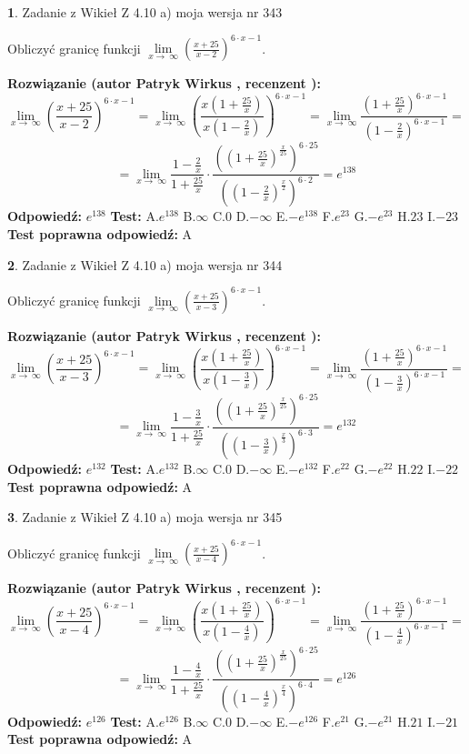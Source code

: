 \documentclass[12pt, a4paper]{article}
\theoremstyle{definition} %
\newtheorem{zad}{}
\newcommand{\zadStart}[1]{\begin{zad}#1\newline}
\newcommand{\zadStop}{\end{zad}}
\newcommand{\rozwStart}[2]{\noindent \textbf{Rozwiązanie (autor #1 , recenzent #2): }\newline}
\newcommand{\rozwStop}{\newline}
\newcommand{\odpStart}{\noindent \textbf{Odpowiedź:}\newline}
\newcommand{\odpStop}{\newline}
\newcommand{\testStart}{\noindent \textbf{Test:}\newline}
\newcommand{\testStop}{\newline}
\newcommand{\kluczStart}{\noindent \textbf{Test poprawna odpowiedź:}\newline}
\newcommand{\kluczStop}{\newline}
\begin{document}
\zadStart{Zadanie z Wikieł Z 4.10 a) moja wersja nr 343}

Obliczyć granicę funkcji  $\lim\limits_{x\to\ \infty}(\frac{x+25}{x-2})^{6\cdot x-1}$.
\zadStop
\rozwStart{Patryk Wirkus}{}
$$\lim\limits_{x\to\ \infty}(\frac{x+25}{x-2})^{6\cdot x-1} = \lim\limits_{x\to\ \infty}(\frac{x(1+\frac{25}{x})}{x(1-\frac{2}{x})})^{6\cdot x-1}=\lim\limits_{x\to\ \infty}\frac{(1+\frac{25}{x})^{6\cdot x-1}}{(1-\frac{2}{x})^{6\cdot x-1}}=$$
$$=\lim\limits_{x\to\ \infty}\frac{1-\frac{2}{x}}{1+\frac{25}{x}}\cdot\frac{((1+\frac{25}{x})^{\frac{x}{25}})^{6\cdot25}}{((1-\frac{2}{x})^{\frac{x}{2}})^{6\cdot2}}=e^{138}$$
\rozwStop
\odpStart
$e^{138}$
\odpStop
\testStart
A.$e^{138}$ B.$\infty$ C.$0$ D.$-\infty$ E.$-e^{138}$
F.$e^{23}$ G.$-e^{23}$
H.$23$
I.$-23$
\testStop
\kluczStart
A
\kluczStop



\zadStart{Zadanie z Wikieł Z 4.10 a) moja wersja nr 344}

Obliczyć granicę funkcji  $\lim\limits_{x\to\ \infty}(\frac{x+25}{x-3})^{6\cdot x-1}$.
\zadStop
\rozwStart{Patryk Wirkus}{}
$$\lim\limits_{x\to\ \infty}(\frac{x+25}{x-3})^{6\cdot x-1} = \lim\limits_{x\to\ \infty}(\frac{x(1+\frac{25}{x})}{x(1-\frac{3}{x})})^{6\cdot x-1}=\lim\limits_{x\to\ \infty}\frac{(1+\frac{25}{x})^{6\cdot x-1}}{(1-\frac{3}{x})^{6\cdot x-1}}=$$
$$=\lim\limits_{x\to\ \infty}\frac{1-\frac{3}{x}}{1+\frac{25}{x}}\cdot\frac{((1+\frac{25}{x})^{\frac{x}{25}})^{6\cdot25}}{((1-\frac{3}{x})^{\frac{x}{3}})^{6\cdot3}}=e^{132}$$
\rozwStop
\odpStart
$e^{132}$
\odpStop
\testStart
A.$e^{132}$ B.$\infty$ C.$0$ D.$-\infty$ E.$-e^{132}$
F.$e^{22}$ G.$-e^{22}$
H.$22$
I.$-22$
\testStop
\kluczStart
A
\kluczStop



\zadStart{Zadanie z Wikieł Z 4.10 a) moja wersja nr 345}

Obliczyć granicę funkcji  $\lim\limits_{x\to\ \infty}(\frac{x+25}{x-4})^{6\cdot x-1}$.
\zadStop
\rozwStart{Patryk Wirkus}{}
$$\lim\limits_{x\to\ \infty}(\frac{x+25}{x-4})^{6\cdot x-1} = \lim\limits_{x\to\ \infty}(\frac{x(1+\frac{25}{x})}{x(1-\frac{4}{x})})^{6\cdot x-1}=\lim\limits_{x\to\ \infty}\frac{(1+\frac{25}{x})^{6\cdot x-1}}{(1-\frac{4}{x})^{6\cdot x-1}}=$$
$$=\lim\limits_{x\to\ \infty}\frac{1-\frac{4}{x}}{1+\frac{25}{x}}\cdot\frac{((1+\frac{25}{x})^{\frac{x}{25}})^{6\cdot25}}{((1-\frac{4}{x})^{\frac{x}{4}})^{6\cdot4}}=e^{126}$$
\rozwStop
\odpStart
$e^{126}$
\odpStop
\testStart
A.$e^{126}$ B.$\infty$ C.$0$ D.$-\infty$ E.$-e^{126}$
F.$e^{21}$ G.$-e^{21}$
H.$21$
I.$-21$
\testStop
\kluczStart
A
\kluczStop
\end{document}
